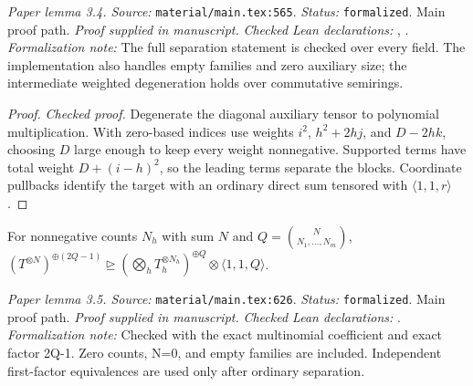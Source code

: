 \noindent\textit{Paper lemma 3.4. Source:} \texttt{material/main.tex:565}.
\textit{Status:} \texttt{formalized}. Main proof path.
\textit{Proof supplied in manuscript.}
\textit{Checked Lean declarations:} , .
\textit{Formalization note:} The full separation statement is checked over every field. The implementation also handles empty families and zero auxiliary size; the intermediate weighted degeneration holds over commutative semirings.

\begin{proof}
\leanok
{}
\textit{Checked proof.} Degenerate the diagonal auxiliary tensor to polynomial multiplication. With zero-based indices use weights $i^2$, $h^2+2hj$, and $D-2hk$, choosing $D$ large enough to keep every weight nonnegative. Supported terms have total weight $D+(i-h)^2$, so the leading terms separate the blocks. Coordinate pullbacks identify the target with an ordinary direct sum tensored with $\langle1,1,r\rangle$.
\end{proof}

\renewcommand{\thetheorem}{3.5}
\begin{lemma}
\label{lem:decoupling-asymptotic}
\manuscriptproof
{}
\leanok
For nonnegative counts $N_h$ with sum $N$ and $Q=\binom{N}{N_1,\ldots,N_m}$, $(T^{\otimes N})^{\oplus(2Q-1)}\trianglerighteq(\bigotimes_hT_h^{\otimes N_h})^{\oplus Q}\otimes\langle1,1,Q\rangle$.
\end{lemma}

\noindent\textit{Paper lemma 3.5. Source:} \texttt{material/main.tex:626}.
\textit{Status:} \texttt{formalized}. Main proof path.
\textit{Proof supplied in manuscript.}
\textit{Checked Lean declarations:} .
\textit{Formalization note:} Checked with the exact multinomial coefficient and exact factor 2Q-1. Zero counts, N=0, and empty families are included. Independent first-factor equivalences are used only after ordinary separation.

